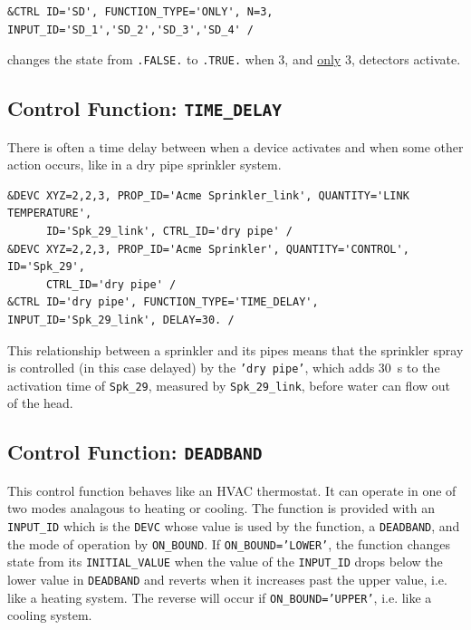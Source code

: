 \documentclass[11pt]{book}
\newcommand{\ct}{\tt\small}
\begin{document}
\footnotesize
\begin{verbatim}
&CTRL ID='SD', FUNCTION_TYPE='ONLY', N=3, INPUT_ID='SD_1','SD_2','SD_3','SD_4' /
\end{verbatim}

\normalsize
\noindent
changes the state from {\ct .FALSE.} to {\ct .TRUE.} when 3,
and \underline{only} 3, detectors activate.


\subsection{Control Function: \texorpdfstring{{\tt TIME\_DELAY}}{TIME\_DELAY}}

\label{info:TIME_DELAY}

There is often a time delay between when a device activates and when some other action occurs, like in a dry pipe sprinkler system.

\footnotesize
\begin{verbatim}
&DEVC XYZ=2,2,3, PROP_ID='Acme Sprinkler_link', QUANTITY='LINK TEMPERATURE',
      ID='Spk_29_link', CTRL_ID='dry pipe' /
&DEVC XYZ=2,2,3, PROP_ID='Acme Sprinkler', QUANTITY='CONTROL', ID='Spk_29',
      CTRL_ID='dry pipe' /
&CTRL ID='dry pipe', FUNCTION_TYPE='TIME_DELAY', INPUT_ID='Spk_29_link', DELAY=30. /
\end{verbatim}
\normalsize

\noindent
This relationship between a sprinkler and its pipes means that the sprinkler spray is controlled (in this case delayed) by the
{\ct 'dry pipe'}, which adds 30~s to the activation time of {\ct Spk\_29}, measured by  {\ct Spk\_29\_link},
before water can flow out of the head.


\subsection{Control Function: \texorpdfstring{{\tt DEADBAND}}{DEADBAND}}
\label{info:DEADBAND}

This control function behaves like an HVAC thermostat.  It can operate in one of two modes analagous to heating or cooling.
The function is provided with an {\ct INPUT\_ID} which is the {\ct DEVC} whose value is used by the function,
a {\ct DEADBAND}, and the mode of operation by {\ct ON\_BOUND}.  If  {\ct ON\_BOUND='LOWER'},
the function changes state from its {\ct INITIAL\_VALUE} when the value of the {\ct INPUT\_ID} drops
below the lower value in {\ct DEADBAND} and reverts when it increases past the upper value, i.e. like a heating system.
The reverse will occur if {\ct ON\_BOUND='UPPER'}, i.e. like a cooling system.
\end{document}
